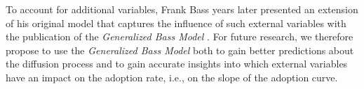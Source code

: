 \documentclass{article}
\begin{document}
\noindent To account for additional variables, Frank Bass years later presented an extension of his original model that captures the influence of such external variables with the
publication of the \emph{Generalized Bass Model} \citep{bass1994bass}. For future research, we therefore propose to use the \emph{Generalized Bass Model} both to gain better
predictions about the diffusion process and to gain accurate insights into which external variables have an impact on the adoption rate, i.e., on the slope of the adoption curve.


\setcounter{secnumdepth}{0}

 
 
\end{document}
